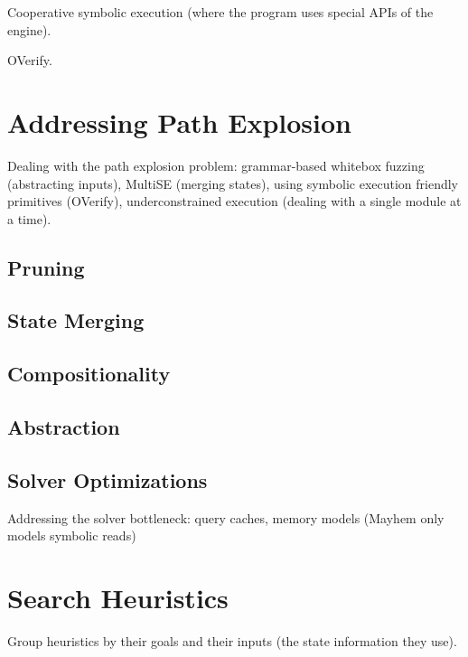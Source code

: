Cooperative symbolic execution (where the program uses special APIs of the engine).

OVerify.


\section{Addressing Path Explosion}
\label{sec:relwork:pathexpl}

Dealing with the path explosion problem: grammar-based whitebox fuzzing (abstracting inputs), MultiSE (merging states), using symbolic execution friendly primitives (OVerify), underconstrained execution (dealing with a single module at a time).

\subsection{Pruning}

\subsection{State Merging}

\subsection{Compositionality}

\subsection{Abstraction}

\subsection{Solver Optimizations}

Addressing the solver bottleneck: query caches, memory models (Mayhem only models symbolic reads)


\section{Search Heuristics}
\label{sec:relwork:heuristics}

Group heuristics by their goals and their inputs (the state information they use).

